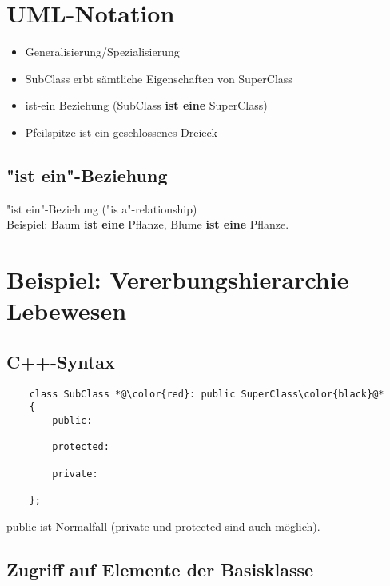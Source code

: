 \section{UML-Notation}
\label{sec:UML-Notation}
\begin{itemize}
	\item Generalisierung/Spezialisierung
	\item SubClass erbt sämtliche Eigenschaften von SuperClass
	\item ist-ein Beziehung (SubClass \textbf{ist eine} SuperClass)
	\item Pfeilspitze ist ein geschlossenes Dreieck
\end{itemize}


\subsection{"ist ein"-Beziehung}
\label{sec:"ist ein"-Beziehung}
"ist ein"-Beziehung ("is a"-relationship)\\
Beispiel: Baum \textbf{ist eine} Pflanze, Blume \textbf{ist eine} Pflanze.

\section{Beispiel: Vererbungshierarchie Lebewesen}
\label{sec:Beispiel: Vererbungshierarchie Lebewesen}


\subsection{C++-Syntax}
\label{sec:C++-Syntax}
\noindent
\begin{minipage}{\linewidth}
	\begin{lstlisting}
	class SubClass *@\color{red}: public SuperClass\color{black}@*
	{
		public:
		
		protected:
		
		private:
		
	};
	\end{lstlisting}
\end{minipage}
public ist Normalfall (private und protected sind auch möglich).

\subsection{Zugriff auf Elemente der Basisklasse}
\label{sec:Zugriff auf Elemente der Basisklasse}


